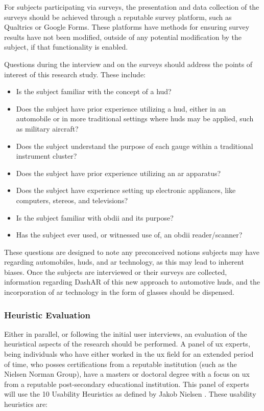             \par For subjects participating via surveys, the presentation and data collection of the surveys should be achieved through a reputable survey platform, such as Qualtrics or Google Forms. These platforms have methods for ensuring survey results have not been modified, outside of any potential modification by the subject, if that functionality is enabled.

            \par Questions during the interview and on the surveys should address the points of interest of this research study. These include:

            \begin{itemize}
                \item Is the subject familiar with the concept of a \gls{hud}?
                \item Does the subject have prior experience utilizing a \gls{hud}, either in an automobile or in more traditional settings where \glspl{hud} may be applied, such as military aircraft?
                \item Does the subject understand the purpose of each gauge within a traditional instrument cluster?
                \item Does the subject have prior experience utilizing an \gls{ar} apparatus?
                \item Does the subject have experience setting up electronic appliances, like computers, stereos, and televisions?
                \item Is the subject familiar with \gls{obdii} and its purpose?
                \item Has the subject ever used, or witnessed use of, an \gls{obdii} reader/scanner?
            \end{itemize}

            \par These questions are designed to note any preconceived notions subjects may have regarding automobiles, \glspl{hud}, and \gls{ar} technology, as this may lead to inherent biases. Once the subjects are interviewed or their surveys are collected, information regarding DashAR of this new approach to automotive \glspl{hud}, and the incorporation of \gls{ar} technology in the form of glasses should be dispensed.

            \subsubsection{Heuristic Evaluation}
                \par Either in parallel, or following the initial user interviews, an evaluation of the heuristical aspects of the research should be performed. A panel of \gls{ux} experts, being individuals who have either worked in the \gls{ux} field for an extended period of time, who posses certifications from a reputable institution (such as the Nielsen Norman Group), have a masters or doctoral degree with a focus on \gls{ux} from a reputable post-secondary educational institution. This panel of experts will use the 10 Usability Heuristics as defined by Jakob Nielsen \cite{Nielsen2024}. These usability heuristics are:

